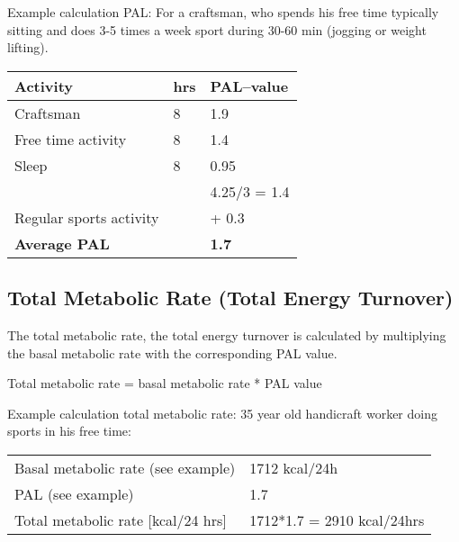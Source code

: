 \documentclass[../main.tex]{subfiles}
\begin{document}
Example calculation PAL:
For a craftsman, who spends his free time typically sitting and does 3-5 times a week sport during 30-60 min (jogging or weight lifting).

  \begin{tabular}{lll}
    \textbf{Activity} & \textbf{hrs} & \textbf{PAL--value} \\
    \hline
    Craftsman & 8 & 1.9 \\
    Free time activity & 8 & 1.4 \\
    Sleep & 8 & 0.95 \\
    \hline
                      & & 4.25/3 = 1.4 \\
    Regular sports activity & & + 0.3 \\
    \hline
    \textbf{Average PAL} & & \textbf{1.7}\\
  \end{tabular}
  \vspace{1mm}

  \subsection{Total Metabolic Rate (Total Energy Turnover)}

  The total metabolic rate, the total energy turnover is calculated by multiplying the basal metabolic rate with the corresponding PAL value.

  \begin{center}
\begin{fminipage}{9cm}
  Total metabolic rate = basal metabolic rate * PAL value
  \end{fminipage}
\end{center}


\vspace{2mm}
\noindent  Example calculation total metabolic rate:
  35 year old handicraft worker doing sports in his free time:

  \begin{tabular}{ll}
    Basal metabolic rate (see example) & 1712 kcal/24h \\
    PAL (see example) & 1.7 \\
    Total metabolic rate [kcal/24 hrs] & 1712*1.7 = 2910 kcal/24hrs
  \end{tabular}

\vspace{2mm}
\end{document}
